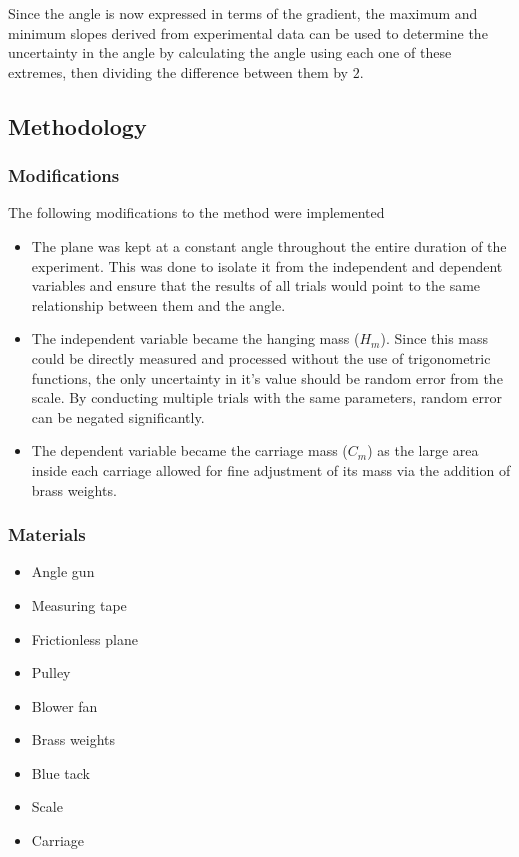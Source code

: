 \documentclass[11pt,a4paper]{article}
\begin{document}
Since the angle is now expressed in terms of the gradient, the maximum and minimum slopes derived from experimental data can be used to determine the uncertainty in the angle by calculating the angle using each one of these extremes, then dividing the difference between them by $2$.




\subsection{Methodology}

\subsubsection{Modifications}


The following modifications to the method were implemented
\begin{itemize}
	\item The plane was kept at a constant angle throughout the entire duration of the experiment. This was done to isolate it from the independent and dependent variables and ensure that the results of all trials would point to the same relationship between them and the angle.
	\item The independent variable became the hanging mass ($H_m$). Since this mass could be directly measured and processed without the use of trigonometric functions, the only uncertainty in it's value should be random error from the scale. By conducting multiple trials with the same parameters, random error can be negated significantly. 
	\item The dependent variable became the carriage mass ($C_m$) as the large area inside each carriage allowed for fine adjustment of its mass via the addition of brass weights. 
\end{itemize}

\subsubsection{Materials}
\begin{itemize}
	\item Angle gun 
	\item Measuring tape
	\item Frictionless plane
	\item Pulley
	\item Blower fan
	\item Brass weights
	\item Blue tack 
	\item Scale
	\item Carriage
\end{itemize}
\end{document}
